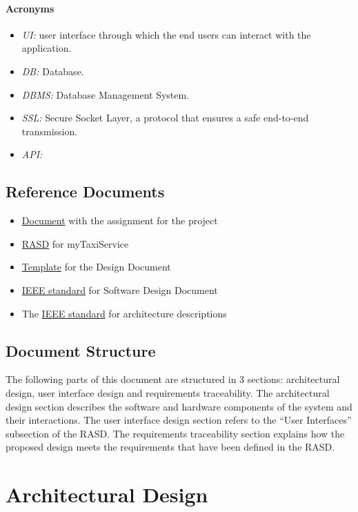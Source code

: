 \documentclass{article}
\begin{document}
\paragraph{Acronyms}
\begin{itemize}
	\item \textit{UI:} user interface through which the end users can interact with the application.
	\item \textit{DB:} Database.
	\item \textit{DBMS:} Database Management System.
	\item \textit{SSL:} Secure Socket Layer, a protocol that ensures a safe end-to-end transmission.
	\item \textit{API:} %
\end{itemize}
\subsection{Reference Documents}
\begin{itemize}
	\item \href{run:./external_references/assignments.pdf}{Document} with the assignment for the project
	\item \href{run:./external_references/Rasd.pdf}{RASD} for myTaxiService
	\item \href{run:./external_references/DDTOC.pdf}{Template} for the Design Document
	\item \href{run:./external_references/IEEESoftwareDesignDescriptions.pdf}{IEEE standard} for Software Design Document
	\item The \href{run:./external_references/IEEEArchitectureDescription.pdf}{IEEE standard} for architecture descriptions
\end{itemize}
\subsection{Document Structure}
The following parts of this document are structured in 3 sections: architectural design, user interface design and requirements traceability. The architectural design section describes the software and hardware components of the system and their interactions. The user interface design section refers to the ``User Interfaces'' subsection of the RASD\@. The requirements traceability section explains how the proposed design meets the requirements that have been defined in the RASD\@.
\clearpage
\section{Architectural Design}
\end{document}
